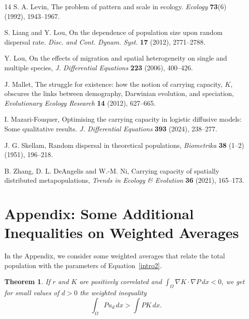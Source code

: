 \documentclass[11pt]{article}
\newtheorem{theorem}[statement]{Theorem}
\theoremstyle{definition}
\theoremstyle{remark}
\begin{document}
\begin{thebibliography}{14}
S. A. Levin, The problem of pattern and scale in ecology. {\em Ecology} {\bf 73}(6) (1992), 1943--1967.

S. Liang and Y. Lou, On the dependence of population size upon random dispersal rate. {\em Disc. and Cont. Dynam. Syst.} {\bf 17} (2012), 2771--2788.

Y. Lou, 
On the effects of migration and spatial heterogeneity on single and multiple species, {\em J. Differential Equations} {\bf 223} (2006), 400--426.

J. Mallet, 
The struggle for existence: how the notion of carrying capacity, $K$, obscures the links between demography, Darwinian evolution,
and speciation, 
{\em Evolutionary Ecology Research} {\bf 14}  (2012),  627--665.

I. Mazari-Fouquer, Optimising the carrying capacity in logistic diffusive models: Some
qualitative results. {\em J. Differential Equations} {\bf 393} (2024), 238--277.

J. G. Skellam, Random dispersal in theoretical populations,  
{\em Biometrika}  {\bf 38} (1–2) (1951), 196--218. 

B. Zhang, D. L. DeAngelis and W.-M. Ni,
Carrying capacity of spatially distributed metapopulations,
{\em Trends in Ecology \& Evolution}  {\bf 36} (2021), 165--173.

\end{thebibliography}

\section{Appendix: Some Additional Inequalities on Weighted Averages}


In the Appendix, we consider some weighted averages that relate the total population with the parameters of Equation~\eqref{intro2}.

\begin{theorem}
     If $r$ and $K$ are positively correlated and  $\displaystyle\int_\Omega\nabla K\cdot \nabla P\,dx<0$, we get for small values of $d>0$ the weighted inequality
        \begin{equation*}
            \int_\Omega Pu_d\,dx>\int PK\,dx.
        \end{equation*}
\end{theorem}
\end{document}
